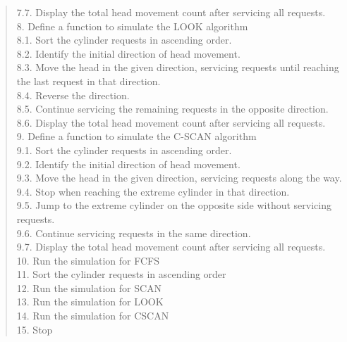\documentclass[a4paper, 12pt]{article}
\begin{document}
\begin{quote}
\hspace*{1cm} 7.7. Display the total head movement count after servicing all requests.  \\ 
8. Define a function to simulate the LOOK algorithm  \\
\hspace*{1cm} 8.1. Sort the cylinder requests in ascending order.  \\
\hspace*{1cm} 8.2. Identify the initial direction of head movement.  \\
\hspace*{1cm} 8.3. Move the head in the given direction, servicing requests until reaching the last request in that direction.  \\
\hspace*{1cm} 8.4. Reverse the direction.  \\
\hspace*{1cm} 8.5. Continue servicing the remaining requests in the opposite direction.  \\
\hspace*{1cm} 8.6. Display the total head movement count after servicing all requests.  \\ 
9. Define a function to simulate the C-SCAN algorithm  \\
\hspace*{1cm} 9.1. Sort the cylinder requests in ascending order.  \\
\hspace*{1cm} 9.2. Identify the initial direction of head movement.  \\
\hspace*{1cm} 9.3. Move the head in the given direction, servicing requests along the way.  \\
\hspace*{1cm} 9.4. Stop when reaching the extreme cylinder in that direction.  \\
\hspace*{1cm} 9.5. Jump to the extreme cylinder on the opposite side without servicing requests.  \\
\hspace*{1cm} 9.6. Continue servicing requests in the same direction.  \\
\hspace*{1cm} 9.7. Display the total head movement count after servicing all requests.  \\
10. Run the simulation for FCFS\\
11. Sort the cylinder requests in ascending order\\
12. Run the simulation for SCAN\\
13. Run the simulation for LOOK\\
14. Run the simulation for CSCAN\\
15. Stop\\
\end{quote}
\end{document}
